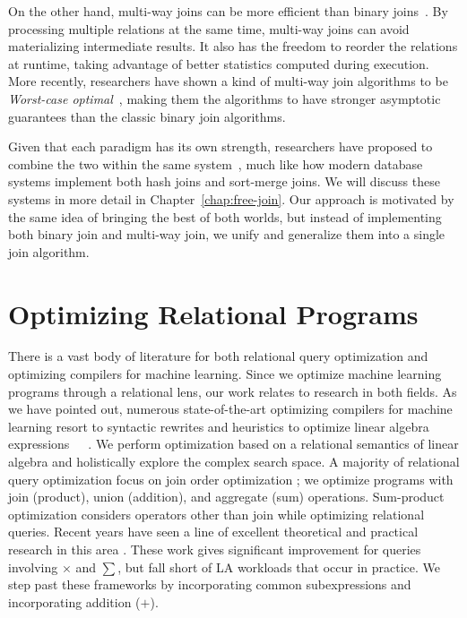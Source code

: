 On the other hand, multi-way joins can be more efficient than binary joins~\cite{DBLP:conf/vldb/GraefeBC98, DBLP:conf/vldb/KemperKW99, DBLP:conf/sigmod/HellersteinA00}.
By processing multiple relations at the same time, 
 multi-way joins can avoid materializing intermediate results. 
It also has the freedom to reorder the relations at runtime,
 taking advantage of better statistics computed during execution.
More recently, researchers have shown a kind of multi-way join algorithms to be 
 {\em Worst-case optimal}~\cite{DBLP:conf/pods/NgoPRR12, DBLP:conf/icdt/Veldhuizen14,
  DBLP:journals/sigmod/NgoRR13, DBLP:conf/pods/000118},
 making them the algorithms to have stronger asymptotic guarantees than the classic binary join algorithms.

Given that each paradigm has its own strength, 
 researchers have proposed to combine the two within the same 
 system~\cite{DBLP:journals/pvldb/FreitagBSKN20,DBLP:journals/tods/AbergerLTNOR17, DBLP:journals/pvldb/MhedhbiS19}, 
 much like how modern database systems implement both hash joins and sort-merge joins.
We will discuss these systems in more detail in Chapter~\ref{chap:free-join}.
Our approach is motivated by the same idea of bringing the best of both worlds, 
 but instead of implementing both binary join and multi-way join,
 we unify and generalize them into a single join algorithm.

\section{Optimizing Relational Programs}
\label{sec:related:linear-algebra}

There is a vast body of literature for both relational query optimization and
optimizing compilers for machine learning. Since we optimize machine learning programs through a
relational lens, our work relates to research in both fields. As we have pointed
out, numerous state-of-the-art optimizing compilers for machine learning
 resort to syntactic rewrites and heuristics to optimize linear algebra
expressions~\cite{DBLP:reference/bdt/Boehm19}~\cite{DBLP:conf/icml/SujeethLBRCWAOO11}~\cite{DBLP:conf/sigmod/HuangB013}. 
We perform optimization based on a
relational semantics of linear algebra and holistically explore the complex
search space. A majority of relational query optimization focus on join order
optimization \cite{Graefe95a} \cite{MoerkotteN06} \cite{MoerkotteN08}
\cite{selinger1979access}; 
we optimize programs with
join (product), union (addition), and aggregate (sum) operations. Sum-product optimization considers operators other than join while optimizing
relational queries. Recent years have seen a line of excellent theoretical and
practical research in this area \cite{KhamisNR16} \cite{Joglekar2016AJARAA}.
These work gives significant improvement for queries involving $\times$ and $\sum$,
but fall short of LA workloads that occur in practice. We step past these
frameworks by incorporating common subexpressions and incorporating addition
($+$). 

